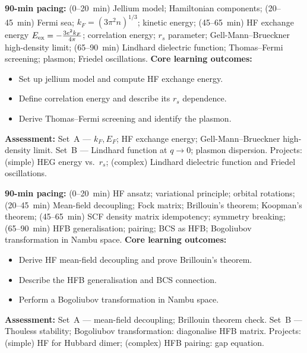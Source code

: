 \documentclass[11pt,a4paper]{article}
\begin{document}
\medskip

\begin{tcolorbox}[modulebox, title={Module~II.4 --- Lecture L03: The Homogeneous Electron Gas}]
\textbf{90-min pacing:} (0--20~min) Jellium model; Hamiltonian components; (20--45~min) Fermi sea; $k_F=(3\pi^2n)^{1/3}$; kinetic energy; (45--65~min) HF exchange energy $E_{\rm ex}=-\tfrac{3e^2k_F}{4\pi}$; correlation energy; $r_s$ parameter; Gell-Mann--Brueckner high-density limit; (65--90~min) Lindhard dielectric function; Thomas--Fermi screening; plasmon; Friedel oscillations.
\medskip\textbf{Core learning outcomes:}
\begin{itemize}[leftmargin=1.4em,topsep=2pt,itemsep=1pt]
  \item Set up jellium model and compute HF exchange energy.
  \item Define correlation energy and describe its $r_s$ dependence.
  \item Derive Thomas--Fermi screening and identify the plasmon.
\end{itemize}
\medskip\textbf{Assessment:}
Set~A --- $k_F,E_F$; HF exchange energy; Gell-Mann--Brueckner high-density limit.
Set~B --- Lindhard function at $q\to0$; plasmon dispersion.
Projects: (simple) HEG energy vs.\ $r_s$; (complex) Lindhard dielectric function and Friedel oscillations.
\end{tcolorbox}

\medskip

\begin{tcolorbox}[modulebox, title={Module~II.4 --- Lecture L04: Hartree--Fock in Second Quantisation}]
\textbf{90-min pacing:} (0--20~min) HF ansatz; variational principle; orbital rotations; (20--45~min) Mean-field decoupling; Fock matrix; Brillouin's theorem; Koopman's theorem; (45--65~min) SCF density matrix idempotency; symmetry breaking; (65--90~min) HFB generalisation; pairing; BCS as HFB; Bogoliubov transformation in Nambu space.
\medskip\textbf{Core learning outcomes:}
\begin{itemize}[leftmargin=1.4em,topsep=2pt,itemsep=1pt]
  \item Derive HF mean-field decoupling and prove Brillouin's theorem.
  \item Describe the HFB generalisation and BCS connection.
  \item Perform a Bogoliubov transformation in Nambu space.
\end{itemize}
\medskip\textbf{Assessment:}
Set~A --- mean-field decoupling; Brillouin theorem check.
Set~B --- Thouless stability; Bogoliubov transformation: diagonalise HFB matrix.
Projects: (simple) HF for Hubbard dimer; (complex) HFB pairing: gap equation.
\end{tcolorbox}
\end{document}
